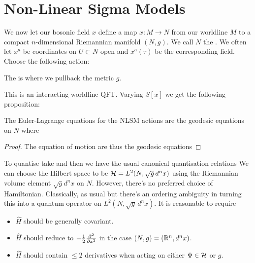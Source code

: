 \documentclass{article}
\begin{document}
\section{Non-Linear Sigma Models}
We now let our bosonic field $x$ define a map $x:M\to N$ from our worldline $M$ to a compact $n$-dimensional Riemannian manifold $(N,g)$. We call $N$ the . We often let $x^a$ be coordinates on $U\subset N$ open and $x^a(\tau)$ be the corresponding field. Choose the following action:
\begin{definition}
	The  is 
where we pullback the metric $g$. 
\end{definition} 
This is an interacting worldline QFT. Varying $S[x]$ we get the following proposition:
\begin{prop}
	The Euler-Lagrange equations for the NLSM actions are the geodesic equations on $N$ 
where 
\end{prop}
\begin{proof}
The equation of motion are thus the geodesic equations 
\end{proof}
To quantise take
and then we have the usual canonical quantisation relations 
We can choose the Hilbert space to be $\mathcal{H} = L^2(N, \sqrt{g} \, d^n x)$ using the Riemannian volume element $\sqrt{g} d^n x$ on $N$. However, there's no preferred choice of Hamiltonian. Classically, as usual
but there's an ordering ambiguity in turning this into a quantum operator on $L^2(N,\sqrt{g} \, d^n x)$. It is reasonable to require 
\begin{itemize}
    \item $\hat{H}$ should be generally covariant. 
    \item $\hat{H}$ should reduce to $-\frac{1}{2}\frac{\partial^2 }{\partial x^2}$ in the case $(N,g)=(\mathbb{R}^n,d^n x)$.
    \item $\hat{H}$ should contain $\leq 2$ derivatives when acting on either $\Psi\in\mathcal{H}$ or $g$. 
\end{itemize}
\end{document}
